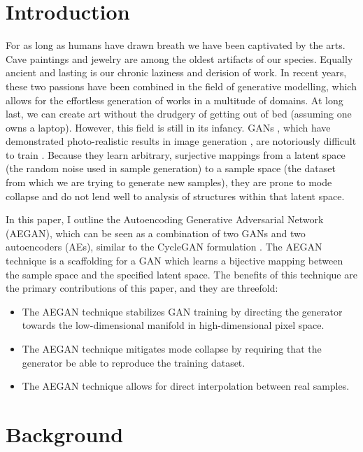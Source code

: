 \documentclass{article}
\begin{document}
\section{Introduction}
For as long as humans have drawn breath we have been captivated by the arts. Cave paintings and jewelry are among the oldest artifacts of our species. Equally ancient and lasting is our chronic laziness and derision of work. In recent years, these two passions have been combined in the field of generative modelling, which allows for the effortless generation of works in a multitude of domains. At long last, we can create art without the drudgery of getting out of bed (assuming one owns a laptop). However, this field is still in its infancy. GANs \cite{goodfellow2014generative}, which have demonstrated photo-realistic results in image generation \cite{zhu2017unpaired, karras2018stylebased, brock2018large}, are notoriously difficult to train \cite{arjovsky2017principled, roth2017}. Because they learn arbitrary, surjective mappings from a latent space (the random noise used in sample generation) to a sample space (the dataset from which we are trying to generate new samples), they are prone to mode collapse \cite{thanhtung2018catastrophic} and do not lend well to analysis of structures within that latent space.

In this paper, I outline the Autoencoding Generative Adversarial Network (AEGAN), which can be seen as a combination of two GANs and two autoencoders (AEs), similar to the CycleGAN formulation \cite{zhu2017unpaired}. The AEGAN technique is a scaffolding for a GAN which learns a bijective mapping between the sample space and the specified latent space. The benefits of this technique are the primary contributions of this paper, and they are threefold:
\begin{itemize}
  \item The AEGAN technique stabilizes GAN training by directing the generator towards the low-dimensional manifold in high-dimensional pixel space.
  \item The AEGAN technique mitigates mode collapse by requiring that the generator be able to reproduce the training dataset.
  \item The AEGAN technique allows for direct interpolation between real samples.
\end{itemize}

\section{Background}
\end{document}

